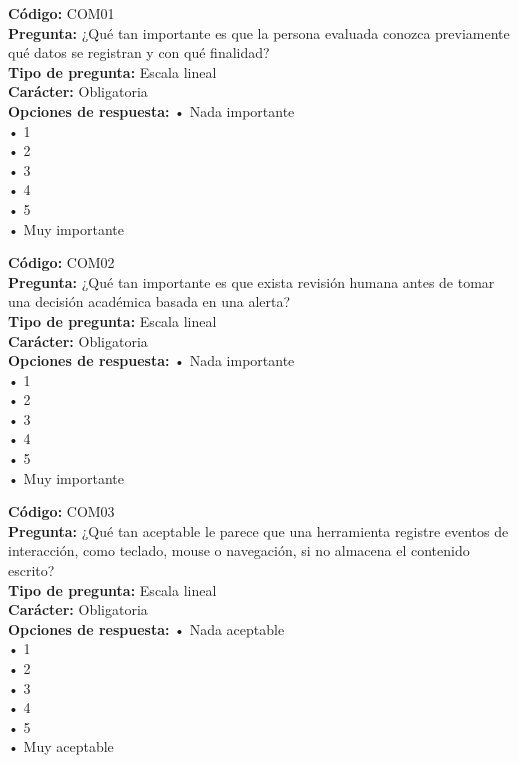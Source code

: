 \begin{infobox}\small
\textbf{\textcolor{accent}{Código:}} COM01\\
\textbf{\textcolor{accent}{Pregunta:}} ¿Qué tan importante es que la persona evaluada conozca previamente qué datos se registran y con qué finalidad?\\
\textbf{\textcolor{accent}{Tipo de pregunta:}} Escala lineal\\
\textbf{\textcolor{accent}{Carácter:}} Obligatoria\\
\textbf{\textcolor{accent}{Opciones de respuesta:}} • Nada importante \\ • 1 \\ • 2 \\ • 3 \\ • 4 \\ • 5 \\ • Muy importante\\
\end{infobox}
\begin{infobox}\small
\textbf{\textcolor{accent}{Código:}} COM02\\
\textbf{\textcolor{accent}{Pregunta:}} ¿Qué tan importante es que exista revisión humana antes de tomar una decisión académica basada en una alerta?\\
\textbf{\textcolor{accent}{Tipo de pregunta:}} Escala lineal\\
\textbf{\textcolor{accent}{Carácter:}} Obligatoria\\
\textbf{\textcolor{accent}{Opciones de respuesta:}} • Nada importante \\ • 1 \\ • 2 \\ • 3 \\ • 4 \\ • 5 \\ • Muy importante\\
\end{infobox}
\begin{infobox}\small
\textbf{\textcolor{accent}{Código:}} COM03\\
\textbf{\textcolor{accent}{Pregunta:}} ¿Qué tan aceptable le parece que una herramienta registre eventos de interacción, como teclado, mouse o navegación, si no almacena el contenido escrito?\\
\textbf{\textcolor{accent}{Tipo de pregunta:}} Escala lineal\\
\textbf{\textcolor{accent}{Carácter:}} Obligatoria\\
\textbf{\textcolor{accent}{Opciones de respuesta:}} • Nada aceptable \\ • 1 \\ • 2 \\ • 3 \\ • 4 \\ • 5 \\ • Muy aceptable\\
\end{infobox}
